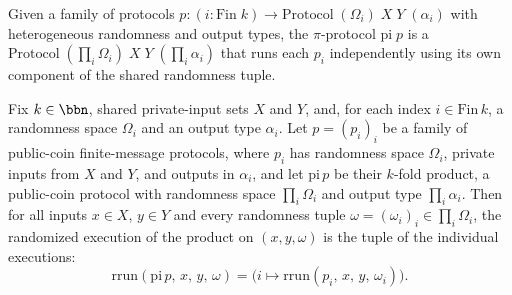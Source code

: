 \begin{definition}
\label{CommunicationComplexity.PublicCoin.FiniteMessage.Protocol.pi}
\leanok
{}
Given a family of protocols $p : (i : \mathrm{Fin}\;k) \to \mathrm{Protocol}\;(\Omega_i)\;X\;Y\;(\alpha_i)$
with heterogeneous randomness and output types, the $\pi$-protocol
$\mathrm{pi}\;p$ is a $\mathrm{Protocol}\;(\prod_i \Omega_i)\;X\;Y\;(\prod_i \alpha_i)$
that runs each $p_i$ independently using its own component of the shared randomness tuple.
\end{definition}

\begin{theorem}
\label{CommunicationComplexity.PublicCoin.FiniteMessage.Protocol.pi_rrun}
\leanok
{}
Fix $k \in \bbn$, shared private-input sets $X$ and $Y$, and, for each index $i \in
\mathrm{Fin}\,k$, a randomness space $\Omega_i$ and an output type $\alpha_i$. Let $p =
(p_i)_{i}$ be a family of public-coin finite-message protocols, where $p_i$ has
randomness space $\Omega_i$, private inputs from $X$ and $Y$, and outputs in $\alpha_i$,
and let $\mathrm{pi}\,p$ be their $k$-fold product, a public-coin protocol with
randomness space $\prod_i \Omega_i$ and output type $\prod_i \alpha_i$. Then for all
inputs $x \in X$, $y \in Y$ and every randomness tuple $\omega = (\omega_i)_i \in
\prod_i \Omega_i$, the randomized execution of the product on $(x, y, \omega)$ is the
tuple of the individual executions:
\[
\mathrm{rrun}(\mathrm{pi}\,p,\, x,\, y,\, \omega) = \bigl(i \mapsto \mathrm{rrun}(p_i,\,
x,\, y,\, \omega_i)\bigr).
\]
\end{theorem}

